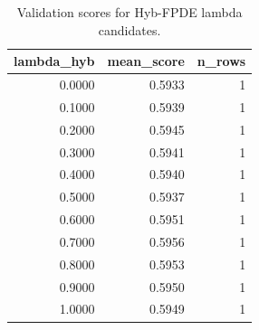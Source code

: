 \begin{table}[t]
\caption{Validation scores for Hyb-FPDE lambda candidates.}
\label{tab:lambda_distribution_computed}
\centering
\begin{tabular}{rrr}
\toprule
lambda\_hyb & mean\_score & n\_rows \\
\midrule
0.0000 & 0.5933 & 1 \\
0.1000 & 0.5939 & 1 \\
0.2000 & 0.5945 & 1 \\
0.3000 & 0.5941 & 1 \\
0.4000 & 0.5940 & 1 \\
0.5000 & 0.5937 & 1 \\
0.6000 & 0.5951 & 1 \\
0.7000 & 0.5956 & 1 \\
0.8000 & 0.5953 & 1 \\
0.9000 & 0.5950 & 1 \\
1.0000 & 0.5949 & 1 \\
\bottomrule
\end{tabular}

\end{table}
